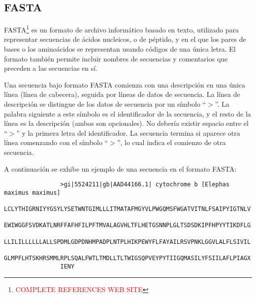 \documentclass[12pt,a4paper,spanish]{article}
\begin{document}
	\subsection{FASTA}
		\par \textsc{FASTA}\footnote{\textcolor{red}{COMPLETE REFERENCES WEB SITE}} es un formato de archivo informático basado en texto, utilizado para representar secuencias de ácidos nucleicos, o de péptido, y en el que 		los pares de bases o los aminoácidos se representan usando códigos de una única letra. El formato también permite incluir nombres de secuencias y 			comentarios que preceden a las secuencias en sí.	

		\par Una secuencia bajo formato \textsc{FASTA} comienza con una descripción en una única línea (línea de cabecera), seguida por líneas de datos de 			secuencia. La línea de descripción se distingue de los datos de secuencia por un símbolo ``$>$''. La palabra siguiente a este símbolo es el 		identificador de la secuencia, y el resto de la línea es la descripción (ambos son opcionales). No debería existir espacio entre el ``$>$'' y la 			primera letra del identificador. La secuencia termina si aparece otra línea comenzando con el símbolo ``$>$'', lo cual indica el comienzo de otra 			secuencia. 
		\par A continuación se exhibe un ejemplo de una secuencia en el formato \textsc{FASTA}:	
		\begin{verbatim}
				>gi|5524211|gb|AAD44166.1| cytochrome b [Elephas maximus maximus]
				LCLYTHIGRNIYYGSYLYSETWNTGIMLLLITMATAFMGYVLPWGQMSFWGATVITNLFSAIPYIGTNLV
				EWIWGGFSVDKATLNRFFAFHFILPFTMVALAGVHLTFLHETGSNNPLGLTSDSDKIPFHPYYTIKDFLG
				LLILILLLLLLALLSPDMLGDPDNHMPADPLNTPLHIKPEWYFLFAYAILRSVPNKLGGVLALFLSIVIL
				GLMPFLHTSKHRSMMLRPLSQALFWTLTMDLLTLTWIGSQPVEYPYTIIGQMASILYFSIILAFLPIAGX
				IENY
		\end{verbatim}
\end{document}
